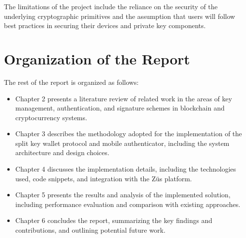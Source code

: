 The limitations of the project include the reliance on the security of the underlying cryptographic primitives and the assumption that users will follow best practices in securing their devices and private key components.

\section{Organization of the Report}
The rest of the report is organized as follows:
\begin{itemize}
    \item Chapter 2 presents a literature review of related work in the areas of key management, authentication, and signature schemes in blockchain and cryptocurrency systems.
    \item Chapter 3 describes the methodology adopted for the implementation of the split key wallet protocol and mobile authenticator, including the system architecture and design choices.
    \item Chapter 4 discusses the implementation details, including the technologies used, code snippets, and integration with the Züs platform.
    \item Chapter 5 presents the results and analysis of the implemented solution, including performance evaluation and comparison with existing approaches.
    \item Chapter 6 concludes the report, summarizing the key findings and contributions, and outlining potential future work.
\end{itemize}
